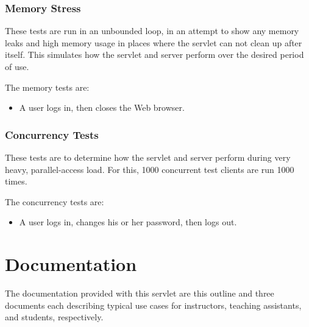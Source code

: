\documentclass[a4paper]{article}
\begin{document}
\subsubsection{Memory Stress}\label{subsubsec:mem-stress}

These tests are run in an unbounded loop, in an attempt to show any memory
leaks and high memory usage in places where the servlet can not clean up after
itself. This simulates how the servlet and server perform over the desired
period of use.

The memory tests are:

\begin{itemize}
\item{A user logs in, then closes the Web browser.}
\end{itemize}

\subsubsection{Concurrency Tests}\label{subsubsec:parrallel-stress}

These tests are to determine how the servlet and server perform during very
heavy, parallel-access load. For this, 1000 concurrent test clients are run
1000 times.

The concurrency tests are:

\begin{itemize}
\item{A user logs in, changes his or her password, then logs out.}
\end{itemize}


\section{Documentation}\label{sec:docs}

The documentation provided with this servlet are this outline and three
documents each describing typical use cases for instructors, teaching
assistants, and students, respectively.
\end{document}
